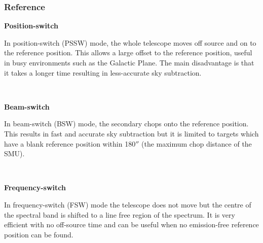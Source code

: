 \documentclass[twoside,11pt]{article}
\renewcommand{\_}{\texttt{\symbol{95}}}
\begin{document}
\subsubsection{Reference}
\begin{minipage}[t]{0.14\linewidth}
\textbf{Position-switch}
\end{minipage}
\begin{minipage}[t]{0.85\linewidth}
In position-switch (PSSW) mode, the whole telescope moves off source and on to the reference position. This allows a large offset to the reference position, useful in busy environments such as the Galactic Plane. The main disadvantage is that it takes a longer time resulting in less-accurate sky subtraction.
\end{minipage}
\vspace{0.7cm}\\
\begin{minipage}[t]{0.14\linewidth}
\textbf{Beam-switch}
\end{minipage}
\begin{minipage}[t]{0.85\linewidth}
In beam-switch (BSW) mode, the secondary chops onto the reference position. This results in fast and accurate sky subtraction but it is limited to targets which have a blank reference position within 180$''$ (the maximum chop distance of the SMU).
\end{minipage}
\vspace{0.7cm}\\
\begin{minipage}[t]{0.14\linewidth}
\textbf{Frequency-switch}
\end{minipage}
\begin{minipage}[t]{0.85\linewidth}
In frequency-switch (FSW) mode the telescope does not move but the centre of the spectral band is shifted to a line free region of the spectrum. It is very efficient with no off-source time and can be useful  when no emission-free reference position can be found.
\end{minipage}
\end{document}
